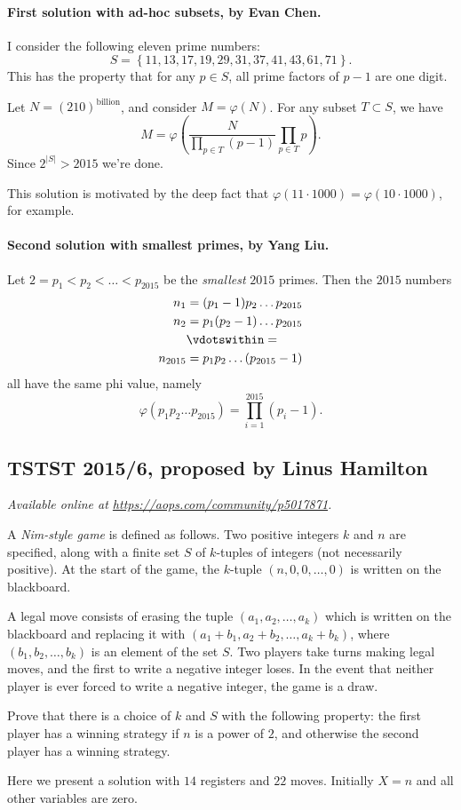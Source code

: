 \documentclass[11pt]{scrartcl}
\begin{document}
\paragraph{First solution with ad-hoc subsets, by Evan Chen.}
I consider the following eleven prime numbers:
\[ S = \left\{ 11, 13, 17, 19, 29, 31, 37, 41, 43, 61, 71 \right\}. \]
This has the property that for any $p \in S$,
all prime factors of $p-1$ are one digit.

Let $N = (210)^{\text{billion}}$,
and consider $M = \varphi\left( N \right)$.
For any subset $T \subset S$, we have
\[ M = \varphi\left(
  \frac{N}{\prod_{p\in T} (p-1)} \prod_{p \in T} p \right). \]
Since $2^{\left\lvert S \right\rvert} > 2015$ we're done.
\begin{remark*}
This solution is motivated by the deep fact that
$\varphi(11 \cdot 1000) = \varphi(10 \cdot 1000)$,
for example.
\end{remark*}

\paragraph{Second solution with smallest primes, by Yang Liu.}
Let $2 = p_1 < p_2 < \dots < p_{2015}$
be the \emph{smallest} $2015$ primes.
Then the $2015$ numbers
\begin{align*}
  n_1 &= (p_1-1) p_2 \dots p_{2015} \\
  n_2 &= p_1 (p_2-1) \dots p_{2015} \\
  &\vdotswithin= \\
  n_{2015} &= p_1 p_2 \dots \left( p_{2015}-1 \right)
\end{align*}
all have the same phi value, namely
\[ \varphi(p_1 p_2 \dots p_{2015}) = \prod_{i=1}^{2015} (p_i-1). \]
\pagebreak

\subsection{TSTST 2015/6, proposed by Linus Hamilton}
\textsl{Available online at \url{https://aops.com/community/p5017871}.}
\begin{mdframed}[style=mdpurplebox,frametitle={Problem statement}]
A \emph{Nim-style game} is defined as follows. Two
positive integers $k$ and $n$ are specified, along with a finite
set $S$ of $k$-tuples of integers (not necessarily positive). At
the start of the game, the $k$-tuple $(n,0,0,\dots,0)$ is written
on the blackboard.

A legal move consists of erasing the tuple $(a_1,a_2,\dots,a_k)$
which is written on the blackboard and replacing it with
$(a_1+b_1,a_2+b_2,\dots,a_k+b_k)$, where $(b_1,b_2,\dots,b_k)$
is an element of the set $S$. Two players take turns making legal
moves, and the first to write a negative integer loses. In the
event that neither player is ever forced to write a negative
integer, the game is a draw.

Prove that there is a choice of $k$ and $S$ with the following
property: the first player has a winning strategy if $n$ is a
power of $2$, and otherwise the second player has a winning
strategy.
\end{mdframed}
Here we present a solution with $14$ registers and $22$ moves.
Initially $X=n$ and all other variables are zero.
\end{document}
